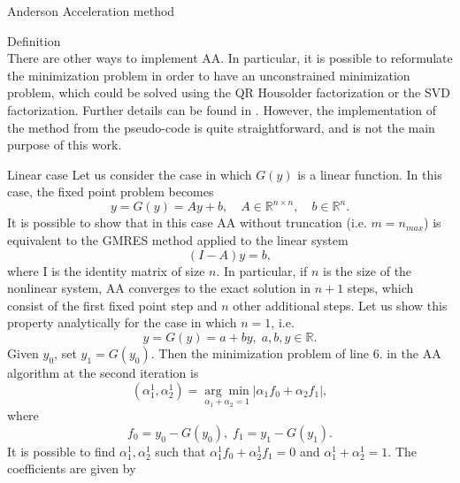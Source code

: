 \documentclass{article}
\begin{document}
\begin{section}{Anderson Acceleration method}
\begin{subsection}{Definition}
\begin{equation*}
\end{equation*}
There are other ways to implement AA. In particular, it is possible to reformulate the minimization problem in order to have an unconstrained minimization problem, which could be solved using the QR Housolder factorization or the SVD factorization. Further details can be found in \cite{SAAD}. However, the implementation of the method from the pseudo-code is quite straightforward, and is not the main purpose of this work.
\end{subsection}

\begin{subsection}{Linear case}\label{subsec:linear}
Let us consider the case in which $G(y)$ is a linear function. In this case, the fixed point problem becomes
\begin{equation*}
	y = G(y) = Ay + b, \quad A \in \mathbb{R}^{n\times n}, \quad b \in \mathbb{R}^{n}.
\end{equation*} 
It is possible to show that in this case AA without truncation (i.e. $m = n_{max}$) is equivalent to the GMRES method \cite{WALNI} applied to the linear system 
\begin{equation*}
	(I - A)y = b,
\end{equation*}
where I is the identity matrix of size $n$. In particular, if $n$ is the size of the nonlinear system, AA converges to the exact solution in $n+1$ steps, which consist of the first fixed point step and $n$ other additional steps. Let us show this property analytically for the case in which $n = 1$, i.e.
\begin{equation*}
	y = G(y) = a + by, \; a,b,y \in \mathbb{R}.
\end{equation*} 
Given $y_0$, set $y_1 = G(y_0)$. Then the minimization problem of line 6. in the AA algorithm at the second iteration is
\begin{equation*}
 	(\alpha_1^1,\alpha_2^1) = \underset{\alpha_1 + \alpha_2 = 1}{\arg\min} |\alpha_1 f_0 + \alpha_2 f_1|,  
\end{equation*}
where
\begin{equation*}
	 f_0 = y_0 - G(y_0), \; f_1 = y_1 - G(y_1).
\end{equation*}
It is possible to find $\alpha_1^1,\alpha_2^1$ such that $\alpha_1^1f_0 + \alpha_2^1f_1 = 0$ and $\alpha_1^1 + \alpha_2^1 = 1$. The coefficients are given by
\begin{equation*}

\end{equation*}
\end{subsection}
\end{section}
\end{document}
